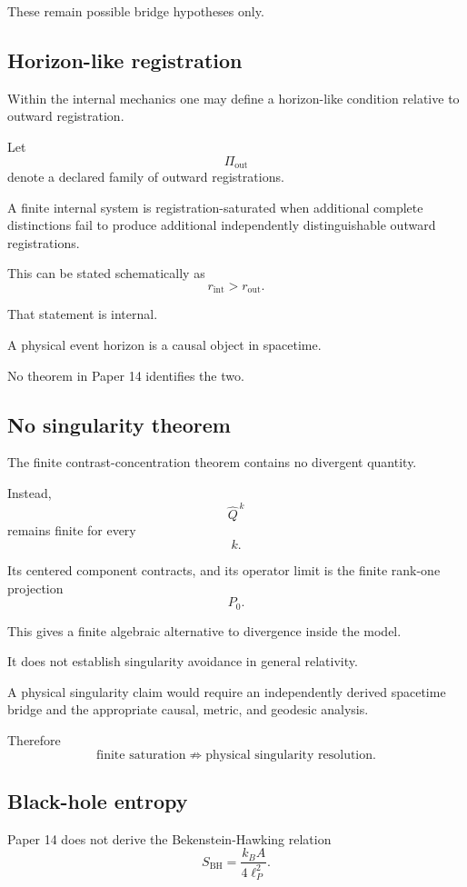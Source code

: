 These remain possible bridge hypotheses only.

\subsection{Horizon-like registration}

Within the internal mechanics one may define a horizon-like condition
relative to outward registration.

Let
\[
\Pi_{\mathrm{out}}
\]
denote a declared family of outward registrations.

A finite internal system is registration-saturated when additional
complete distinctions fail to produce additional independently
distinguishable outward registrations.

This can be stated schematically as
\[
r_{\mathrm{int}}
>
r_{\mathrm{out}}.
\]

That statement is internal.

A physical event horizon is a causal object in spacetime.

No theorem in Paper 14 identifies the two.

\subsection{No singularity theorem}

The finite contrast-concentration theorem contains no divergent
quantity.

Instead,
\[
\widehat Q^{\,k}
\]
remains finite for every
\[
k.
\]

Its centered component contracts, and its operator limit is the
finite rank-one projection
\[
P_0.
\]

This gives a finite algebraic alternative to divergence inside the
model.

It does not establish singularity avoidance in general relativity.

A physical singularity claim would require an independently derived
spacetime bridge and the appropriate causal, metric, and geodesic
analysis.

Therefore
\[
\text{finite saturation}
\not\Rightarrow
\text{physical singularity resolution}.
\]

\subsection{Black-hole entropy}

Paper 14 does not derive the Bekenstein-Hawking relation
\[
S_{\mathrm{BH}}
=
\frac{k_BA}{4\ell_P^2}.
\]

